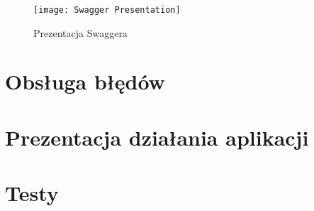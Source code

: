 \begin{figure}[H]
	\texttt{[image: Swagger Presentation]}
	\caption{Prezentacja Swaggera}
\end{figure}

\section{Obsługa błędów}

\section{Prezentacja działania aplikacji}

\section{Testy}

